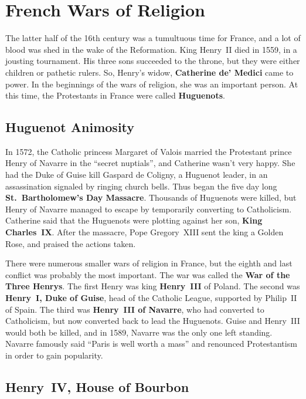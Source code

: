 \section{French Wars of Religion}

The latter half of the 16th century was a tumultuous time for France,
and a lot of blood was shed in the wake of the Reformation.
King Henry~II died in 1559, in a jousting tournament.
His three sons succeeded to the throne, but they were either children or pathetic rulers.
So, Henry's widow, \textbf{Catherine de' Medici} came to power.
In the beginnings of the wars of religion, she was an important person.
At this time, the Protestants in France were called \textbf{Huguenots}.

\subsection*{Huguenot Animosity}

In 1572, the Catholic princess Margaret of Valois married
the Protestant prince Henry of Navarre in the ``secret nuptials'', and Catherine wasn't very happy.
She had the Duke of Guise kill Gaspard de Coligny, a Huguenot leader,
in an assassination signaled by ringing church bells.
Thus began the five day long \textbf{St.\ Bartholomew's Day Massacre}.
Thousands of Huguenots were killed, but Henry of Navarre managed to escape by temporarily converting to Catholicism.
Catherine said that the Huguenots were plotting against her son, \textbf{King Charles~IX}\@.
After the massacre, Pope Gregory~XIII sent the king a Golden Rose, and praised the actions taken.

There were numerous smaller wars of religion in France, but the eighth and last conflict was probably the most important.
The war was called the \textbf{War of the Three Henrys}.
The first Henry was king \textbf{Henry~III} of Poland.
The second was \textbf{Henry~I, Duke of Guise}, head of the Catholic League, supported by Philip~II of Spain.
The third was \textbf{Henry~III of Navarre}, who had converted to Catholicism,
but now converted back to lead the Huguenots.
Guise and Henry~III would both be killed, and in 1589, Navarre was the only one left standing.
Navarre famously said ``Paris is well worth a mass'' and renounced Protestantism in order to gain popularity.

\subsection*{Henry~IV, House of Bourbon}

